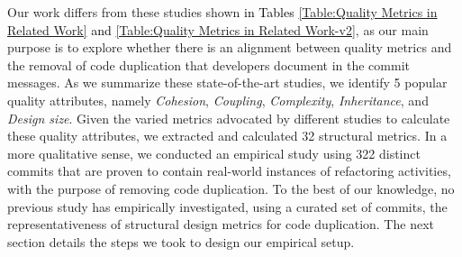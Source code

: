 Our work differs from these studies shown \textcolor{black}{in Tables \ref{Table:Quality Metrics in Related Work} and \ref{Table:Quality Metrics in Related Work-v2}}, as our main purpose is to explore whether there is an alignment between quality metrics and the removal of code duplication that developers document in the commit messages. As we summarize these state-of-the-art studies, we identify 5 popular quality attributes, namely \textit{Cohesion}, \textit{Coupling}, \textit{Complexity}, \textit{Inheritance}, and \textit{Design size}. Given the varied metrics advocated by different studies to calculate these quality attributes, we extracted and calculated 32 structural metrics. In a more qualitative sense, we conducted an empirical study using 322 distinct commits that are proven to contain real-world instances of refactoring activities, with the purpose of removing code duplication. To the best of our knowledge, no previous study has empirically investigated, using a curated set of commits, the representativeness of structural design metrics for code duplication. The next section details the steps we took to design our empirical setup.